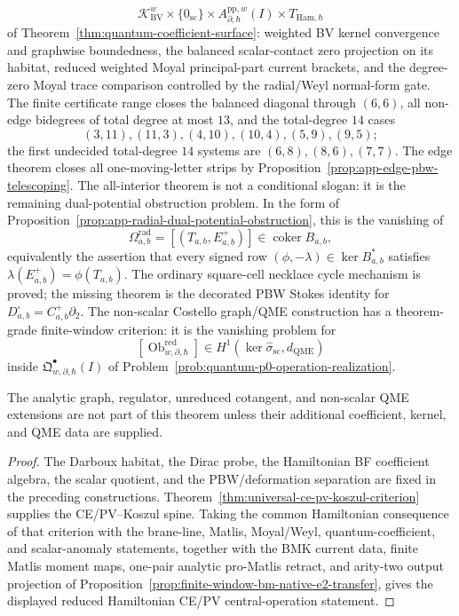 \documentclass[11pt]{memoir}
\begin{document}
\begin{thm}
\[    \mathcal K_{\mathrm{BV}}^w
    \times\{0_{\mathrm{sc}}\}
    \times A^{\mathrm{pp},w}_{\partial,\hbar}(I)
    \times T_{\mathrm{Ham},\hbar}
  \]
  of Theorem~\ref{thm:quantum-coefficient-surface}: weighted BV kernel
  convergence and graphwise boundedness, the balanced scalar-contact
  zero projection on its habitat, reduced weighted Moyal principal-part
  current brackets, and the degree-zero Moyal trace comparison
  controlled by the radial/Weyl normal-form gate.  The finite certificate
  range closes the balanced diagonal through \((6,6)\), all non-edge
  bidegrees of total degree at most \(13\), and the total-degree \(14\)
  cases
  \[
    (3,11),(11,3),(4,10),(10,4),(5,9),(9,5);
  \]
  the first undecided total-degree \(14\) systems are
  \((6,8),(8,6),(7,7)\).  The edge theorem closes all
  one-moving-letter strips by
  Proposition~\ref{prop:app-edge-pbw-telescoping}.  The all-interior
  theorem is not a conditional slogan: it is the remaining
  dual-potential obstruction problem.  In the form of
  Proposition~\ref{prop:app-radial-dual-potential-obstruction}, this is
  the vanishing of
  \[
    \Omega^{\mathrm{rad}}_{a,b}
      =
    [(T_{a,b},E^+_{a,b})]\in\operatorname{coker}B_{a,b},
  \]
  equivalently the assertion that every signed row
  \((\phi,-\lambda)\in\ker B_{a,b}^*\) satisfies
  \(\lambda(E^+_{a,b})=\phi(T_{a,b})\).  The ordinary square-cell
  necklace cycle mechanism is proved; the missing theorem is the
  decorated PBW Stokes identity for
  \(D^\square_{a,b}=C^+_{a,b}\partial_2\).  The non-scalar
  Costello graph/QME construction has a theorem-grade finite-window
  criterion: it is the vanishing problem for
  \[
    [\operatorname{Ob}^{\mathrm{red}}_{w,\partial,\hbar}]
    \in H^1(\ker\widehat\sigma_{\mathrm{sc}},d_{\mathrm{QME}})
  \]
  inside
  \(\mathfrak Q^\bullet_{w,\partial,\hbar}(I)\) of
  Problem~\ref{prob:quantum-p0-operation-realization}.

  The analytic graph, regulator, unreduced cotangent, and non-scalar QME
  extensions are not part of this theorem unless their additional
  coefficient, kernel, and QME data are supplied.
\end{thm}

\begin{proof}
  The Darboux habitat, the Dirac probe, the Hamiltonian BF coefficient
  algebra, the scalar quotient, and the PBW/deformation separation are
  fixed in the preceding constructions.
  Theorem~\ref{thm:universal-ce-pv-koszul-criterion} supplies the
  CE/PV--Koszul spine. Taking the common Hamiltonian consequence of that
  criterion with the brane-line, Matlis, Moyal/Weyl, quantum-coefficient,
  and scalar-anomaly statements, together with the BMK current data,
  finite Matlis moment maps, one-pair analytic pro-Matlis retract, and
  arity-two output projection of
  Proposition~\ref{prop:finite-window-bm-native-e2-transfer},
  gives the displayed reduced Hamiltonian CE/PV central-operation
  statement.
\end{proof}
\end{document}
